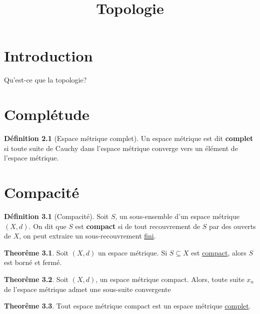 \documentclass[12pt]{book}
\title{Topologie}
\theoremstyle{definition}
\newtheorem{definition}{Définition}[section]
\newtheorem{theorem}{Theorême}[section]
\begin{document}
\chapter{Introduction}
Qu'est-ce que la topologie?

\chapter{Complétude}
\begin{definition}[Espace métrique complet]
    \label{def:completude}
    Un espace métrique est dit \textbf{complet} si toute suite de Cauchy dans l'espace métrique converge vers un élément de l'espace métrique.
\end{definition}

\chapter{Compacité}
\begin{definition}[Compacité]
    \label{def:compacite}
    Soit $S$, un sous-ensemble d'un espace métrique $(X,d)$. On dit que $S$ est \textbf{compact} si de tout recouvrement de $S$ par des ouverts de $X$,
    on peut extraire un sous-recouvrement \underline{fini}.
\end{definition}

\begin{theorem}
    Soit $(X,d)$ un espace métrique. Si $S \subseteq X$ est \hyperref[def:compacite]{compact}, alors $S$ est borné et fermé.
\end{theorem}

\begin{theorem}
    \label{thm:compact_implique_sous_suite}
    Soit $(X,d)$, un espace métrique compact. Alors, toute suite ${x_n}$ de l'espace métrique admet une sous-suite convergente 
\end{theorem}

\begin{theorem}
    Tout espace métrique compact est un espace métrique \hyperref[def:completude]{complet}.
\end{theorem}
\end{document}
